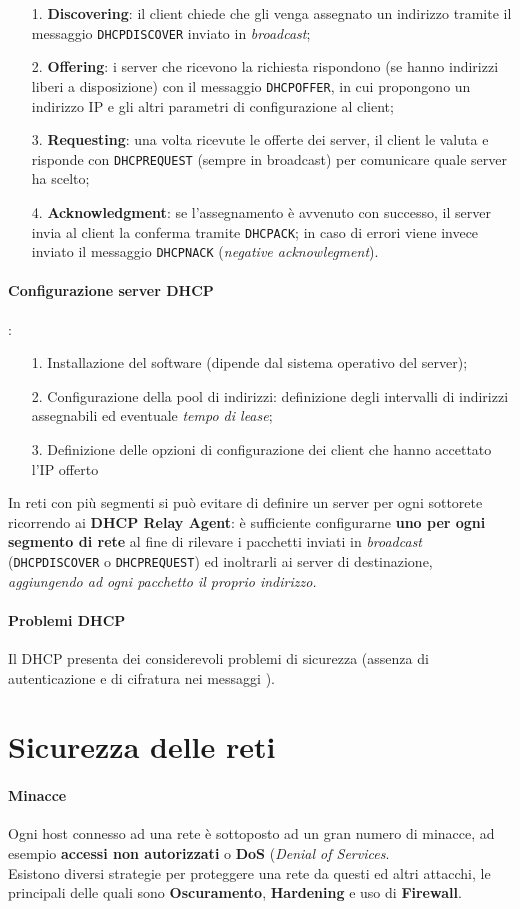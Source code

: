 \documentclass[a4paper,11pt]{article}
\def\code#1{\texttt{#1}}
\def\para#1{\paragraph{#1}\label{#1}}
\def\italic#1{\textit{#1}}
\begin{document}
\begin{itemize}
	\item[1.] \textbf{Discovering}: il client chiede che gli venga assegnato un indirizzo tramite il messaggio \code{DHCPDISCOVER} inviato in \textit{broadcast};
	\item[2.] \textbf{Offering}: i server che ricevono la richiesta rispondono (se hanno indirizzi liberi a disposizione) con il messaggio \code{DHCPOFFER}, in cui propongono un indirizzo IP e gli altri parametri di configurazione al client;
	\item[3.] \textbf{Requesting}: una volta ricevute le offerte dei server, il client le valuta e risponde con \code{DHCPREQUEST} (sempre in broadcast) per comunicare quale server ha scelto;
	\item[4.] \textbf{Acknowledgment}: se l'assegnamento è avvenuto con successo, il server invia al client la conferma tramite \code{DHCPACK}; in caso di errori viene invece inviato il messaggio \code{DHCPNACK} (\italic{negative acknowlegment}).
\end{itemize}
\para{Configurazione server DHCP}:
\begin{itemize}
	\item[1.] Installazione del software (dipende dal sistema operativo del server);
	\item[2.] Configurazione della pool di indirizzi: definizione degli intervalli di indirizzi assegnabili ed eventuale \italic{tempo di lease};
	\item[3.] Definizione delle opzioni di configurazione dei client che hanno accettato l'IP offerto
\end{itemize}
In reti con più segmenti si può evitare di definire un server per ogni sottorete ricorrendo ai \textbf{DHCP Relay Agent}: è sufficiente configurarne \textbf{uno per ogni segmento di rete} al fine di rilevare i pacchetti inviati in \italic{broadcast} (\code{DHCPDISCOVER} o \code{DHCPREQUEST}) ed inoltrarli ai server di destinazione, \textit{aggiungendo ad ogni pacchetto il proprio indirizzo.\\}
\para{Problemi DHCP} Il DHCP presenta dei considerevoli problemi di sicurezza (assenza di autenticazione e di cifratura nei messaggi ).

\newpage
\section{Sicurezza delle reti}
\para{Minacce} 
Ogni host connesso ad una rete è sottoposto ad un gran numero di minacce, ad esempio \textbf{accessi non autorizzati} o \textbf{DoS} (\textit{Denial of Services}.\\
Esistono diversi strategie per proteggere una rete da questi ed altri attacchi, le principali delle quali sono \textbf{Oscuramento}, \textbf{Hardening} e uso di \textbf{Firewall}.
\end{document}
